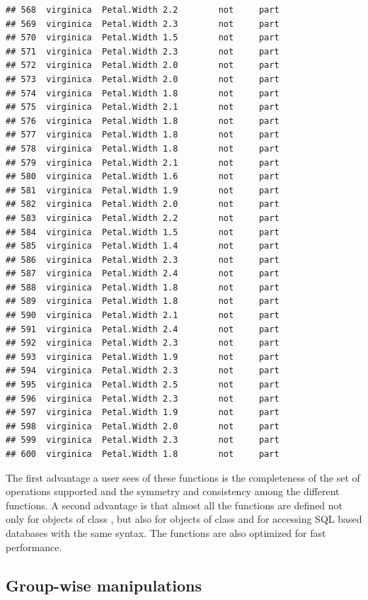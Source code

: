 \documentclass[krantz2]{krantz}\usepackage{knitr}%
\begin{document}
\begin{knitrout}
\begin{kframe}
\begin{verbatim}
## 568  virginica  Petal.Width 2.2        not     part
## 569  virginica  Petal.Width 2.3        not     part
## 570  virginica  Petal.Width 1.5        not     part
## 571  virginica  Petal.Width 2.3        not     part
## 572  virginica  Petal.Width 2.0        not     part
## 573  virginica  Petal.Width 2.0        not     part
## 574  virginica  Petal.Width 1.8        not     part
## 575  virginica  Petal.Width 2.1        not     part
## 576  virginica  Petal.Width 1.8        not     part
## 577  virginica  Petal.Width 1.8        not     part
## 578  virginica  Petal.Width 1.8        not     part
## 579  virginica  Petal.Width 2.1        not     part
## 580  virginica  Petal.Width 1.6        not     part
## 581  virginica  Petal.Width 1.9        not     part
## 582  virginica  Petal.Width 2.0        not     part
## 583  virginica  Petal.Width 2.2        not     part
## 584  virginica  Petal.Width 1.5        not     part
## 585  virginica  Petal.Width 1.4        not     part
## 586  virginica  Petal.Width 2.3        not     part
## 587  virginica  Petal.Width 2.4        not     part
## 588  virginica  Petal.Width 1.8        not     part
## 589  virginica  Petal.Width 1.8        not     part
## 590  virginica  Petal.Width 2.1        not     part
## 591  virginica  Petal.Width 2.4        not     part
## 592  virginica  Petal.Width 2.3        not     part
## 593  virginica  Petal.Width 1.9        not     part
## 594  virginica  Petal.Width 2.3        not     part
## 595  virginica  Petal.Width 2.5        not     part
## 596  virginica  Petal.Width 2.3        not     part
## 597  virginica  Petal.Width 1.9        not     part
## 598  virginica  Petal.Width 2.0        not     part
## 599  virginica  Petal.Width 2.3        not     part
## 600  virginica  Petal.Width 1.8        not     part
\end{verbatim}
\end{kframe}
\end{knitrout}

The first advantage a user sees of these functions is the completeness of the set of operations supported and the symmetry and consistency among the different functions. A second advantage is that almost all the functions are defined not only for objects of class , but also for objects of class  and for accessing SQL based databases with the same syntax. The functions are also optimized for fast performance.

\subsection{Group-wise manipulations}
\end{document}

